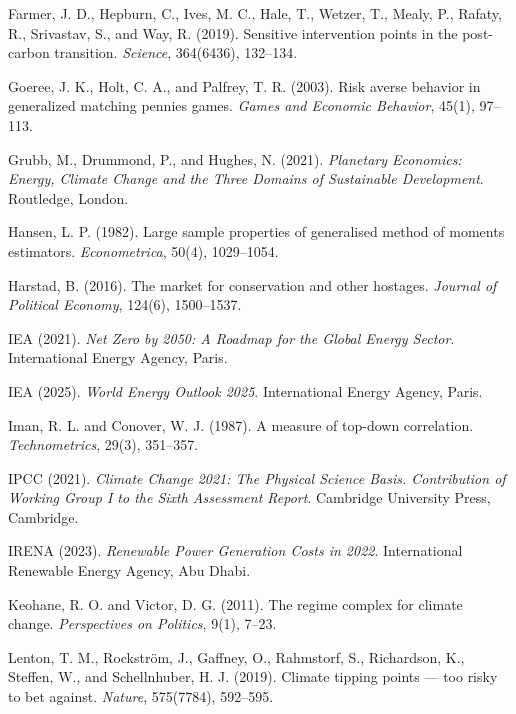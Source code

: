 \documentclass[10pt,a4paper]{article}
\begin{document}
\begin{list}{}{\setlength\leftmargin{1.5em}\setlength\itemindent{-1.5em}\setlength\itemsep{0.4em}}
\item Farmer, J. D., Hepburn, C., Ives, M. C., Hale, T., Wetzer, T., Mealy, P., Rafaty, R., Srivastav, S.,
and Way, R. (2019). Sensitive intervention points in the post-carbon transition. \textit{Science},
364(6436), 132--134.

\item Goeree, J. K., Holt, C. A., and Palfrey, T. R. (2003). Risk averse behavior in generalized matching
pennies games. \textit{Games and Economic Behavior}, 45(1), 97--113.

\item Grubb, M., Drummond, P., and Hughes, N. (2021). \textit{Planetary Economics: Energy, Climate
Change and the Three Domains of Sustainable Development}. Routledge, London.

\item Hansen, L. P. (1982). Large sample properties of generalised method of moments estimators.
\textit{Econometrica}, 50(4), 1029--1054.

\item Harstad, B. (2016). The market for conservation and other hostages. \textit{Journal of Political
Economy}, 124(6), 1500--1537.

\item IEA (2021). \textit{Net Zero by 2050: A Roadmap for the Global Energy Sector}. International Energy
Agency, Paris.

\item IEA (2025). \textit{World Energy Outlook 2025}. International Energy Agency, Paris.

\item Iman, R. L. and Conover, W. J. (1987). A measure of top-down correlation. \textit{Technometrics},
29(3), 351--357.

\item IPCC (2021). \textit{Climate Change 2021: The Physical Science Basis. Contribution of Working Group
I to the Sixth Assessment Report}. Cambridge University Press, Cambridge.

\item IRENA (2023). \textit{Renewable Power Generation Costs in 2022}. International Renewable Energy
Agency, Abu Dhabi.

\item Keohane, R. O. and Victor, D. G. (2011). The regime complex for climate change.
\textit{Perspectives on Politics}, 9(1), 7--23.

\item Lenton, T. M., Rockstr\"{o}m, J., Gaffney, O., Rahmstorf, S., Richardson, K., Steffen, W.,
and Schellnhuber, H. J. (2019). Climate tipping points --- too risky to bet against.
\textit{Nature}, 575(7784), 592--595.


\end{list}
\end{document}
